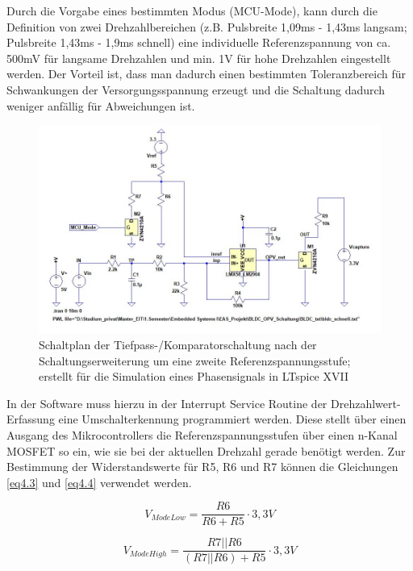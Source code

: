 Durch die Vorgabe eines bestimmten Modus (MCU-Mode), kann durch die Definition von zwei Drehzahlbereichen (z.B. Pulsbreite 1,09ms - 1,43ms langsam; Pulsbreite 1,43ms - 1,9ms schnell) eine individuelle Referenzspannung von ca. 500mV für langsame Drehzahlen und min. 1V für hohe Drehzahlen eingestellt werden. Der Vorteil ist, dass man dadurch einen bestimmten Toleranzbereich für Schwankungen der Versorgungsspannung erzeugt und die Schaltung dadurch weniger anfällig für Abweichungen ist.\vspace{11pt}

\begin{figure}[H] %
\includegraphics[width=.99\textwidth]{sec4/images/Schaltungserweiterung} 
\centering
\captionsetup{width=.95\textwidth}
\caption[Schaltplan der Tiefpass-/Komparatorschaltung nach der Schaltungserweiterung]{Schaltplan der Tiefpass-/Komparatorschaltung nach der Schaltungserweiterung um eine zweite Referenzspannungsstufe; erstellt für die Simulation eines Phasensignals in LTspice XVII}\centering
\label{fig:Schaltungserweiterung}
\end{figure}

In der Software muss hierzu in der Interrupt Service Routine der Drehzahlwert-Erfassung eine Umschalterkennung programmiert werden. Diese stellt über einen Ausgang des Mikrocontrollers die Referenzspannungsstufen über einen n-Kanal MOSFET so ein, wie sie bei der aktuellen Drehzahl gerade benötigt werden. Zur Bestimmung der Widerstandswerte für R5, R6 und R7 können die Gleichungen \ref{eq4.3} und \ref{eq4.4} verwendet werden.\vspace{11pt}

\begin{equation}\label{eq4.3}
V_{ModeLow} = \frac{ R6 }{R6 + R5 }\cdot 3,3V
\end{equation}

\begin{equation}\label{eq4.4}
V_{ModeHigh} = \frac{ R7 || R6 }{(R7 || R6) + R5}\cdot 3,3V
\end{equation}

\newpage
